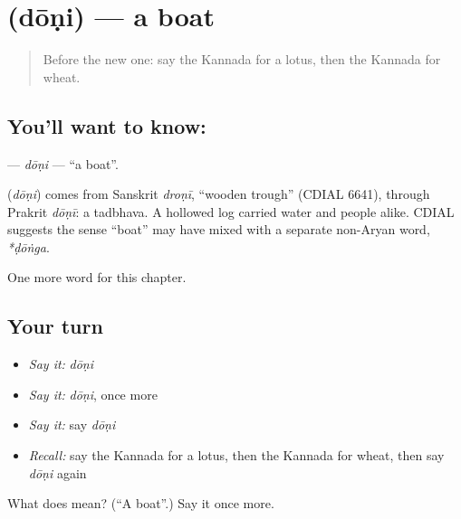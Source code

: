 \section[\texorpdfstring{\kn{ದೋಣಿ} (dōṇi)}{ದೋಣಿ (dōṇi)}]{ (dōṇi) — a boat}

\label{lesson:KA-C139-doni}



\begin{quote}
Before the new one: say the Kannada for a lotus, then the Kannada for wheat.
\end{quote}

\subsection*{You'll want to know: }
\textbf{} — \emph{dōṇi} — \textquotedblleft{}a boat\textquotedblright{}.

\begin{cousinweb}
\textbf{} (\emph{dōṇi}) comes from Sanskrit \emph{droṇī}, \textquotedblleft{}wooden trough\textquotedblright{} (CDIAL 6641), through Prakrit \emph{dōṇī}: a tadbhava. A hollowed log carried water and people alike. CDIAL suggests the sense \textquotedblleft{}boat\textquotedblright{} may have mixed with a separate non-Aryan word, \emph{*ḍōṅga}.
\end{cousinweb}

\begin{grammarlens}[title={What you've built}]
One more word for this chapter.
\end{grammarlens}

\subsection*{Your turn}
\begin{itemize}
\raggedright
  \item \emph{Say it:} \emph{dōṇi}
  \item \emph{Say it:} \emph{dōṇi}, once more
  \item \emph{Say it:} say \emph{dōṇi}
  \item \emph{Recall:} say the Kannada for a lotus, then the Kannada for wheat, then say \emph{dōṇi} again
\end{itemize}

\begin{tcolorbox}[breakable,colback=teal!4,colframe=teal!35!black,title={Before you move on}]
What does  mean? (\textquotedblleft{}A boat\textquotedblright{}.) Say it once more.
\end{tcolorbox}
